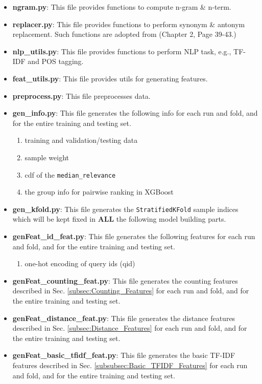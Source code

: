 \documentclass[12pt]{article}
\begin{document}
\begin{itemize}
\item \textbf{ngram.py}: This file provides functions to compute n-gram \& n-term.
\item \textbf{replacer.py}: This file provides functions to perform synonym \& antonym replacement. Such functions are adopted from \cite{NLTK_Cookbook} (Chapter 2, Page 39-43.)
\item \textbf{nlp\_utils.py}: This file provides functions to perform NLP task, e.g., TF-IDF and POS tagging.
\item \textbf{feat\_utils.py}: This file provides utils for generating features.
\item \textbf{preprocess.py}: This file preprocesses data.
\item \textbf{gen\_info.py}: This file generates the following info for each run and fold, and for the entire training and testing set.
        \begin{enumerate}
            \item training and validation/testing data
            \item sample weight
            \item cdf of the \texttt{median\_relevance}
            \item the group info for pairwise ranking in XGBoost
        \end{enumerate}
\item \textbf{gen\_kfold.py}: This file generates the \texttt{StratifiedKFold} sample indices which will be kept fixed in \textbf{ALL} the following model building parts.
\item \textbf{genFeat\_id\_feat.py}: This file generates the following features for each run and fold, and for the entire training and testing set.
    \begin{enumerate}
    \item one-hot encoding of query ids (qid)
    \end{enumerate}
\item \textbf{genFeat\_counting\_feat.py}: This file generates the counting features described in Sec. \ref{subsec:Counting_Features} for each run and fold, and for the entire training and testing set.
\item \textbf{genFeat\_distance\_feat.py}: This file generates the distance features described in Sec. \ref{subsec:Distance_Features} for each run and fold, and for the entire training and testing set.
\item \textbf{genFeat\_basic\_tfidf\_feat.py}: This file generates the basic TF-IDF features described in Sec. \ref{subsubsec:Basic_TFIDF_Features} for each run and fold, and for the entire training and testing set.

\end{itemize}
\end{document}
